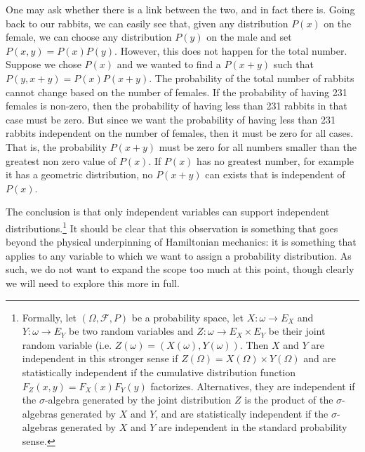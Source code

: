 One may ask whether there is a link between the two, and in fact there is. Going back to our rabbits, we can easily see that, given any distribution $P(x)$ on the female, we can choose any distribution $P(y)$ on the male and set $P(x,y)=P(x)P(y)$. However, this does not happen for the total number. Suppose we chose $P(x)$ and we wanted to find a $P(x+y)$ such that $P(y, x+y) = P(x)P(x+y)$. The probability of the total number of rabbits cannot change based on the number of females. If the probability of having 231 females is non-zero, then the probability of having less than 231 rabbits in that case must be zero. But since we want the probability of having less than 231 rabbits independent on the number of females, then it must be zero for all cases. That is, the probability $P(x+y)$ must be zero for all numbers smaller than the greatest non zero value of $P(x)$. If $P(x)$ has no greatest number, for example it has a geometric distribution, no $P(x+y)$ can exists that is independent of $P(x)$.

The conclusion is that only independent variables can support independent distributions.\footnote{Formally, let $(\Omega, \mathcal{F}, P)$ be a probability space, let $X : \omega \to E_X$ and $Y : \omega \to E_Y$ be two random variables and $Z : \omega \to E_X \times E_Y$ be their joint random variable (i.e. $Z(\omega) = (X(\omega), Y(\omega))$. Then $X$ and $Y$ are independent in this stronger sense if $Z(\Omega) = X(\Omega) \times Y(\Omega)$ and are statistically independent if the cumulative distribution function $F_Z(x,y)=F_X(x)F_Y(y)$ factorizes. Alternatives, they are independent if the $\sigma$-algebra generated by the joint distribution $Z$ is the product of the $\sigma$-algebras generated by $X$ and $Y$, and are statistically independent if the $\sigma$-algebras generated by $X$ and $Y$ are independent in the standard probability sense. } It should be clear that this observation is something that goes beyond the physical underpinning of Hamiltonian mechanics: it is something that applies to any variable to which we want to assign a probability distribution. As such, we do not want to expand the scope too much at this point, though clearly we will need to explore this more in full.


